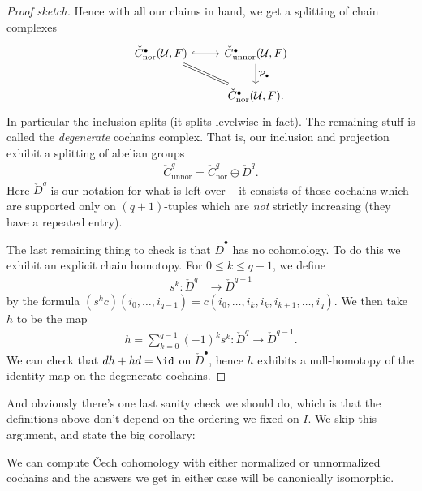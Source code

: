 \documentclass[11pt]{book}
\begin{document}
\begin{proof}[Proof sketch]
Hence with all our claims in hand, we get a splitting of chain complexes
\[ \begin{tikzcd}
    {\check{C}^\bullet_\text{nor}(\mathcal{U},F)}\rar[hook]\ar[dr,equal] & {\check{C}^\bullet_\text{unnor}(\mathcal{U},F)}\dar["\mathcal{P}_\bullet" right]\\
     & {\check{C}^\bullet_\text{nor}(\mathcal{U},F)}.
\end{tikzcd} \]
In particular the inclusion splits (it splits levelwise in fact). The remaining stuff is called the \emph{degenerate} cochains complex. That is, our inclusion and projection exhibit a splitting of abelian groups
\begin{align*}
    \check{C}^q_\text{unnor} = \check{C}^q_\text{nor} \oplus \check{D}^q.
\end{align*}
Here $\check{D}^q$ is our notation for what is left over -- it consists of those cochains which are supported only on $(q+1)$-tuples which are \emph{not} strictly increasing (they have a repeated entry).

The last remaining thing to check is that $\check{D}^\bullet$ has no cohomology. To do this we exhibit an explicit chain homotopy. For $0\le k\le q-1$, we define
\begin{align*}
    s^k \colon \check{D}^q &\to \check{D}^{q-1}
\end{align*}
by the formula $(s^k c)(i_0, \ldots, i_{q-1}) = c(i_0, \ldots, i_k,i_k,i_{k+1}, \ldots, i_q)$. We then take $h$ to be the map
\begin{align*}
    h = \sum_{k=0}^{q-1} (-1)^k s^k \colon \check{D}^q \to \check{D}^{q-1}.
\end{align*}
We can check that $dh + hd = \id$ on $\check{D}^\bullet$, hence $h$ exhibits a null-homotopy of the identity map on the degenerate cochains.
\end{proof}

And obviously there's one last sanity check we should do, which is that the definitions above don't depend on the ordering we fixed on $I$. We skip this argument, and state the big corollary:

\begin{corollary}\label{cor:normalized-unnormalized-doesnt-matter} We can compute \v{C}ech cohomology with either normalized or unnormalized cochains and the answers we get in either case will be canonically isomorphic.
\end{corollary}
\end{document}
